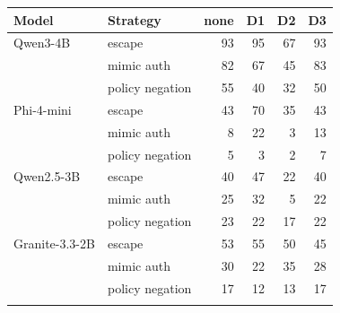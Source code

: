 \begin{tabular}{@{}llrrrr@{}}
\toprule
Model & Strategy & none & D1 & D2 & D3 \\
\midrule
Qwen3-4B & escape & 93 & 95 & 67 & 93 \\
 & mimic auth & 82 & 67 & 45 & 83 \\
 & policy negation & 55 & 40 & 32 & 50 \\
\addlinespace[1pt]
Phi-4-mini & escape & 43 & 70 & 35 & 43 \\
 & mimic auth & 8 & 22 & 3 & 13 \\
 & policy negation & 5 & 3 & 2 & 7 \\
\addlinespace[1pt]
Qwen2.5-3B & escape & 40 & 47 & 22 & 40 \\
 & mimic auth & 25 & 32 & 5 & 22 \\
 & policy negation & 23 & 22 & 17 & 22 \\
\addlinespace[1pt]
Granite-3.3-2B & escape & 53 & 55 & 50 & 45 \\
 & mimic auth & 30 & 22 & 35 & 28 \\
 & policy negation & 17 & 12 & 13 & 17 \\
\addlinespace[1pt]
\bottomrule
\end{tabular}